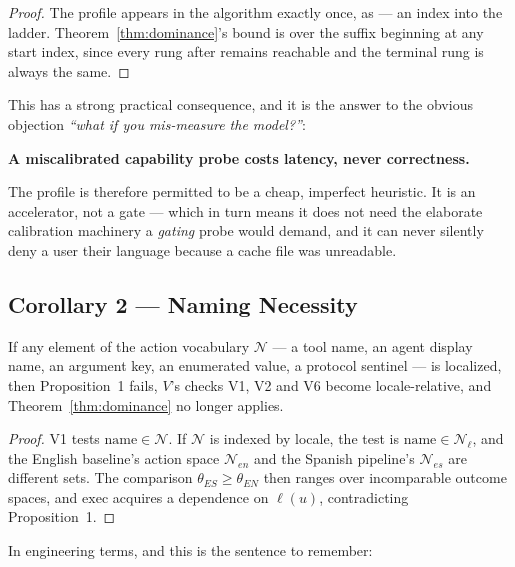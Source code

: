 \begin{proof}
The profile appears in the algorithm exactly once, as  --- an index
into the ladder. Theorem~\ref{thm:dominance}'s bound is over the suffix
beginning at any start index, since every rung after  remains
reachable and the terminal rung is always the same.
\end{proof}

This has a strong practical consequence, and it is the answer to the obvious
objection \emph{``what if you mis-measure the model?''}:

\begin{keyinsight}
\textbf{A miscalibrated capability probe costs latency, never correctness.}
\end{keyinsight}

The profile is therefore permitted to be a cheap, imperfect heuristic. It is an
accelerator, not a gate --- which in turn means it does not need the elaborate
calibration machinery a \emph{gating} probe would demand, and it can never
silently deny a user their language because a cache file was unreadable.

\subsection{Corollary 2 --- Naming Necessity}
\label{sec:naming-necessity}

\begin{corollary}
\label{cor:naming}
If any element of the action vocabulary $\mathcal{N}$ --- a tool name, an agent
display name, an argument key, an enumerated value, a protocol sentinel --- is
localized, then Proposition~1 fails, $V$'s checks V1, V2 and V6 become
locale-relative, and Theorem~\ref{thm:dominance} no longer applies.
\end{corollary}

\begin{proof}
V1 tests $\mathrm{name} \in \mathcal{N}$. If $\mathcal{N}$ is indexed by locale,
the test is $\mathrm{name} \in \mathcal{N}_\ell$, and the English baseline's
action space $\mathcal{N}_{en}$ and the Spanish pipeline's $\mathcal{N}_{es}$
are different sets. The comparison $\theta_{ES} \ge \theta_{EN}$ then ranges
over incomparable outcome spaces, and $\mathrm{exec}$ acquires a dependence on
$\ell(u)$, contradicting Proposition~1.
\end{proof}

In engineering terms, and this is the sentence to remember:

